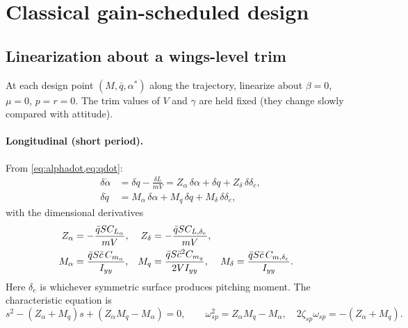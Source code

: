 \documentclass[11pt]{report}
\numberwithin{equation}{chapter}
\begin{document}
\section{Classical gain-scheduled design}

\subsection{Linearization about a wings-level trim}

At each design point $(M, \bar q, \alpha^*)$ along the trajectory, linearize about
$\beta = 0$, $\mu = 0$, $p = r = 0$. The trim values of $V$ and $\gamma$ are held fixed
(they change slowly compared with attitude).

\paragraph{Longitudinal (short period).} From \cref{eq:alphadot,eq:qdot}:
\begin{align}
  \delta\dot\alpha &= \delta q - \frac{\delta L}{mV}
    = Z_\alpha\,\delta\alpha + \delta q + Z_{\delta}\,\delta\delta_e, \\
  \delta\dot q &= M_\alpha\,\delta\alpha + M_q\,\delta q + M_{\delta}\,\delta\delta_e,
\end{align}
with the dimensional derivatives
\begin{align}
  Z_\alpha &= -\frac{\bar q S C_{L_\alpha}}{m V}, &
  Z_\delta &= -\frac{\bar q S C_{L,\delta_e}}{m V}, \notag\\
  M_\alpha &= \frac{\bar q S\bar c\, C_{m_\alpha}}{I_{yy}}, &
  M_q &= \frac{\bar q S\bar c^2 C_{m_q}}{2 V I_{yy}}, &
  M_\delta &= \frac{\bar q S\bar c\, C_{m,\delta_e}}{I_{yy}} .
\end{align}
Here $\delta_e$ is whichever symmetric surface produces pitching moment. The characteristic
equation is
\begin{equation}
  s^2 - \left(Z_\alpha + M_q\right)s + \left(Z_\alpha M_q - M_\alpha\right) = 0,
  \qquad
  \omega_{sp}^2 = Z_\alpha M_q - M_\alpha,\quad
  2\zeta_{sp}\omega_{sp} = -\left(Z_\alpha + M_q\right).
\end{equation}
\end{document}
